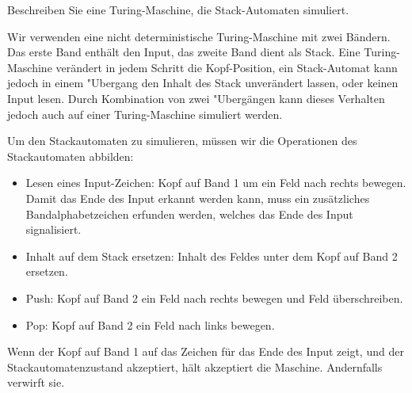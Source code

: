 Beschreiben Sie eine Turing-Maschine, die Stack-Automaten simuliert.

\begin{loesung}
Wir verwenden eine nicht deterministische Turing-Maschine mit zwei Bändern.
Das erste Band
enthält den Input, das zweite Band dient als Stack. Eine Turing-Maschine
verändert in jedem Schritt die Kopf-Position, ein Stack-Automat kann
jedoch in einem "Ubergang den Inhalt des Stack unverändert lassen,
oder keinen Input lesen. Durch Kombination von zwei "Ubergängen
kann dieses Verhalten jedoch auch auf einer Turing-Maschine simuliert
werden.

Um den Stackautomaten zu simulieren, müssen wir die Operationen des
Stackautomaten abbilden:
\begin{itemize}
\item Lesen eines Input-Zeichen: Kopf auf Band 1 um ein Feld nach
rechts bewegen. Damit das Ende des Input erkannt werden kann, muss ein
zusätzliches Bandalphabetzeichen erfunden werden, welches das Ende
des Input signalisiert.
\item Inhalt auf dem Stack ersetzen: Inhalt des Feldes unter dem Kopf
auf Band 2 ersetzen.
\item Push: Kopf auf Band 2 ein Feld nach rechts bewegen und Feld überschreiben.
\item Pop: Kopf auf Band 2 ein Feld nach links bewegen.
\end{itemize}
Wenn der Kopf auf Band 1 auf das Zeichen für das Ende des Input zeigt,
und der Stackautomatenzustand akzeptiert, hält akzeptiert die Maschine.
Andernfalls verwirft sie.
\end{loesung}
